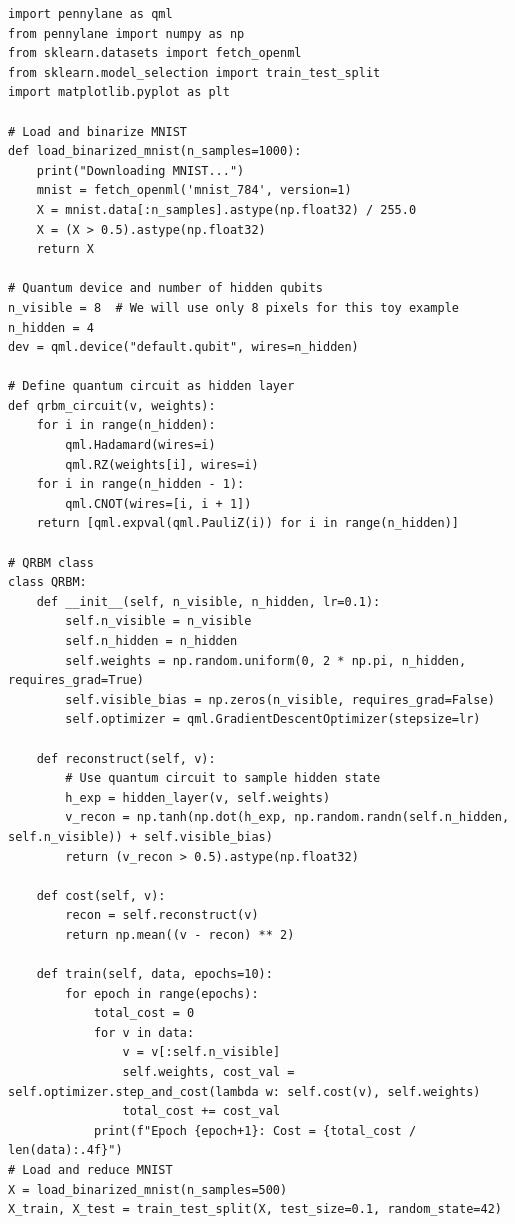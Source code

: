 \documentclass[%
oneside,                 %
final,                   %
10pt]{article}
\begin{document}
\begin{verbatim}
import pennylane as qml
from pennylane import numpy as np
from sklearn.datasets import fetch_openml
from sklearn.model_selection import train_test_split
import matplotlib.pyplot as plt

# Load and binarize MNIST
def load_binarized_mnist(n_samples=1000):
    print("Downloading MNIST...")
    mnist = fetch_openml('mnist_784', version=1)
    X = mnist.data[:n_samples].astype(np.float32) / 255.0
    X = (X > 0.5).astype(np.float32)
    return X

# Quantum device and number of hidden qubits
n_visible = 8  # We will use only 8 pixels for this toy example
n_hidden = 4
dev = qml.device("default.qubit", wires=n_hidden)

# Define quantum circuit as hidden layer
def qrbm_circuit(v, weights):
    for i in range(n_hidden):
        qml.Hadamard(wires=i)
        qml.RZ(weights[i], wires=i)
    for i in range(n_hidden - 1):
        qml.CNOT(wires=[i, i + 1])
    return [qml.expval(qml.PauliZ(i)) for i in range(n_hidden)]

# QRBM class
class QRBM:
    def __init__(self, n_visible, n_hidden, lr=0.1):
        self.n_visible = n_visible
        self.n_hidden = n_hidden
        self.weights = np.random.uniform(0, 2 * np.pi, n_hidden, requires_grad=True)
        self.visible_bias = np.zeros(n_visible, requires_grad=False)
        self.optimizer = qml.GradientDescentOptimizer(stepsize=lr)

    def reconstruct(self, v):
        # Use quantum circuit to sample hidden state
        h_exp = hidden_layer(v, self.weights)
        v_recon = np.tanh(np.dot(h_exp, np.random.randn(self.n_hidden, self.n_visible)) + self.visible_bias)
        return (v_recon > 0.5).astype(np.float32)

    def cost(self, v):
        recon = self.reconstruct(v)
        return np.mean((v - recon) ** 2)

    def train(self, data, epochs=10):
        for epoch in range(epochs):
            total_cost = 0
            for v in data:
                v = v[:self.n_visible]
                self.weights, cost_val = self.optimizer.step_and_cost(lambda w: self.cost(v), self.weights)
                total_cost += cost_val
            print(f"Epoch {epoch+1}: Cost = {total_cost / len(data):.4f}")
# Load and reduce MNIST
X = load_binarized_mnist(n_samples=500)
X_train, X_test = train_test_split(X, test_size=0.1, random_state=42)


\end{verbatim}
\end{document}
